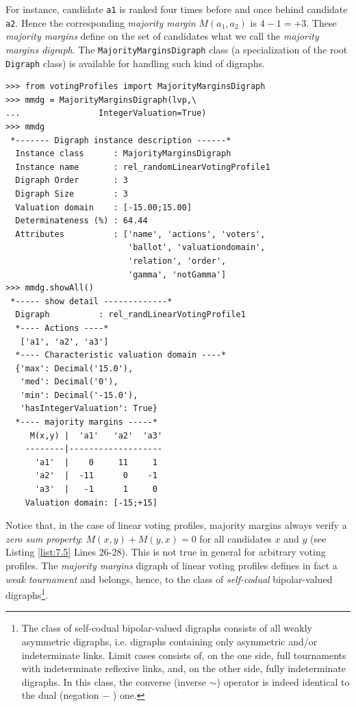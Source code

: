 For instance, candidate \texttt{a1} is ranked four times before and once behind candidate \texttt{a2}. Hence the corresponding \emph{majority margin} $M(a_1,a_2)$ is $4 - 1 = +3$. These \emph{majority margins} define on the set of candidates what we call the \emph{majority margins digraph}. The \texttt{MajorityMarginsDigraph} class (a specialization of the root \texttt{Digraph} class) is available for handling such kind of digraphs.
\begin{lstlisting}[caption={Example of \emph{Majority Margins} digraph},label=list:7.5]
>>> from votingProfiles import MajorityMarginsDigraph
>>> mmdg = MajorityMarginsDigraph(lvp,\
...                IntegerValuation=True)
>>> mmdg
 *------- Digraph instance description ------*
  Instance class      : MajorityMarginsDigraph
  Instance name       : rel_randomLinearVotingProfile1
  Digraph Order       : 3
  Digraph Size        : 3
  Valuation domain    : [-15.00;15.00]
  Determinateness (%) : 64.44
  Attributes          : ['name', 'actions', 'voters',
                         'ballot', 'valuationdomain',
                         'relation', 'order',
                         'gamma', 'notGamma']
>>> mmdg.showAll()
 *----- show detail -------------*
  Digraph          : rel_randLinearVotingProfile1
  *---- Actions ----*
   ['a1', 'a2', 'a3']
  *---- Characteristic valuation domain ----*
  {'max': Decimal('15.0'),
   'med': Decimal('0'),
   'min': Decimal('-15.0'),
   'hasIntegerValuation': True}
  *---- majority margins -----*
     M(x,y) |  'a1'   'a2'  'a3'	  
    --------|-------------------
      'a1'  |    0     11     1	 
      'a2'  |  -11      0    -1	 
      'a3'  |   -1      1     0	 
    Valuation domain: [-15;+15]
\end{lstlisting}

Notice that, in the case of linear voting profiles, majority margins always verify a \emph{zero sum property}: $M(x,y) + M(y,x) = 0$ for all candidates $x$ and $y$ (see Listing \ref{list:7.5} Lines 26-28). This is not true in general for arbitrary voting profiles. The \emph{majority margins} digraph of linear voting profiles defines in fact a \emph{weak tournament} and belongs, hence, to the class of \emph{self-codual} bipolar-valued digraphs\footnote{The class of self-codual bipolar-valued digraphs consists of all weakly asymmetric digraphs, i.e. digraphs containing only asymmetric and/or indeterminate links. Limit cases consists of, on the one side, full tournaments with indeterminate reflexive links, and, on the other side, fully indeterminate digraphs. In this class, the converse (inverse $\sim$) operator is indeed identical to the dual (negation $-$ ) one.}.
    
